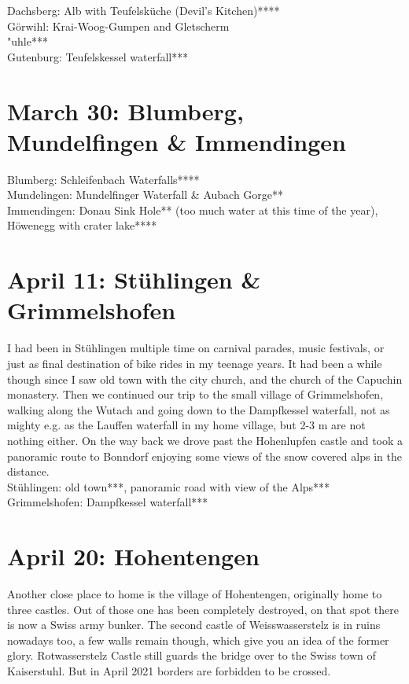 Dachsberg: Alb with Teufelsk\"uche (Devil's Kitchen)****\\
G\"orwihl: Krai-Woog-Gumpen and Gletscherm\\"uhle***\\
Gutenburg: Teufelskessel waterfall***

\section{March 30: Blumberg, Mundelfingen \& Immendingen}
\label{2021:Blumberg}

Blumberg: Schleifenbach Waterfalls****\\
Mundelingen: Mundelfinger Waterfall \& Aubach Gorge**\\
Immendingen: Donau Sink Hole** (too much water at this time of the year), H\"owenegg with crater lake****\\

\section{April 11: St\"uhlingen \& Grimmelshofen}
\label{2021Stuehlingen}

I had been in St\"uhlingen multiple time on carnival parades, music festivals, or just as final destination of bike rides in my teenage years. It had been a while though since I saw old town with the city church, and the church of the Capuchin monastery. Then we continued our trip to the small village of Grimmelshofen, walking along the Wutach and going down to the Dampfkessel waterfall, not as mighty e.g. as the Lauffen waterfall in my home village, but 2-3 m are not nothing either. On the way back we drove past the Hohenlupfen castle and took a panoramic route to Bonndorf enjoying some views of the snow covered alps in the distance.\\

St\"uhlingen: old town***, panoramic road with view of the Alps***\\
Grimmelshofen: Dampfkessel waterfall***

\section{April 20: Hohentengen}
\label{2021Hohentengen}

Another close place to home is the village of Hohentengen, originally home to three castles. Out of those one has been completely destroyed, on that spot there is now a Swiss army bunker. The second castle of Weisswasserstelz is in ruins nowadays too, a few walls remain though, which give you an idea of the former glory. Rotwasserstelz Castle still guards the bridge over to the Swiss town of Kaiserstuhl. But in April 2021 borders are forbidden to be crossed.\\

